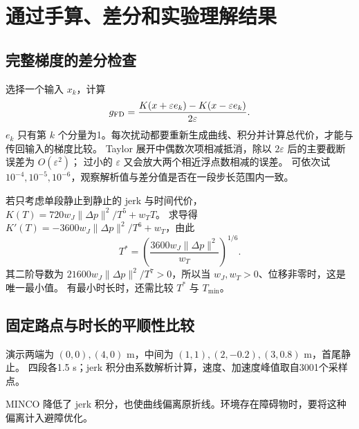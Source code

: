 \section{通过手算、差分和实验理解结果}
\subsection{完整梯度的差分检查}
选择一个输入 $x_k$，计算
\[
 g_{\rm FD}=\frac{K(x+\varepsilon e_k)-K(x-\varepsilon e_k)}{2\varepsilon}.
\]
$e_k$ 只有第 $k$ 个分量为1。每次扰动都要重新生成曲线、积分并计算总代价，才能与传回输入的梯度比较。
Taylor 展开中偶数次项相减抵消，除以 $2\varepsilon$ 后的主要截断误差为 $O(\varepsilon^2)$；
过小的 $\varepsilon$ 又会放大两个相近浮点数相减的误差。
可依次试 $10^{-4},10^{-5},10^{-6}$，观察解析值与差分值是否在一段步长范围内一致。

若只考虑单段静止到静止的 jerk 与时间代价，
$K(T)=720w_J\|\Delta p\|^2/T^5+w_TT$。
求导得 $K'(T)=-3600w_J\|\Delta p\|^2/T^6+w_T$，由此
\[
 T^*=\left(\frac{3600w_J\|\Delta p\|^2}{w_T}\right)^{1/6}.
\]
其二阶导数为 $21600w_J\|\Delta p\|^2/T^7>0$，所以当 $w_J,w_T>0$、位移非零时，这是唯一最小值。
有最小时长时，还需比较 $T^*$ 与 $T_{\min}$。

\subsection{固定路点与时长的平顺性比较}
演示两端为 $(0,0),(4,0)$ m，中间为 $(1,1),(2,-0.2),(3,0.8)$ m，首尾静止。
四段各1.5 s；jerk 积分由系数解析计算，速度、加速度峰值取自3001个采样点。
\begin{center}\small
{}
\end{center}
MINCO 降低了 jerk 积分，也使曲线偏离原折线。环境存在障碍物时，要将这种偏离计入避障优化。

